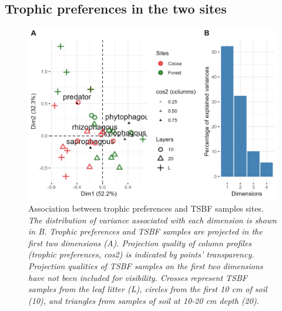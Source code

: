 \documentclass[fleqn,10pt]{ArtEcoFoG} %
\begin{document}
\subsection{Trophic preferences in the two sites}\label{trophic-preferences-in-the-two-sites}

\scriptsize

\begin{figure}

{\centering \includegraphics[width=0.8\linewidth,]{rapport_files/figure-latex/trophic-1} 

}

\caption{Association between trophic preferences and TSBF samples sites. \textit{The distribution of variance associated with each dimension is shown in B. Trophic preferences and TSBF samples are projected in the first two dimensions (A). Projection quality of column profiles (trophic preferences, cos2) is indicated by points’ transparency. Projection qualities of TSBF samples on the first two dimensions have not been included for visibility. Crosses represent TSBF samples from the leaf litter (L), circles from the first 10 cm of soil (10), and triangles from samples of soil at 10-20 cm depth (20).}}\label{fig:trophic}
\end{figure}

\normalsize

\scriptsize
\end{document}
